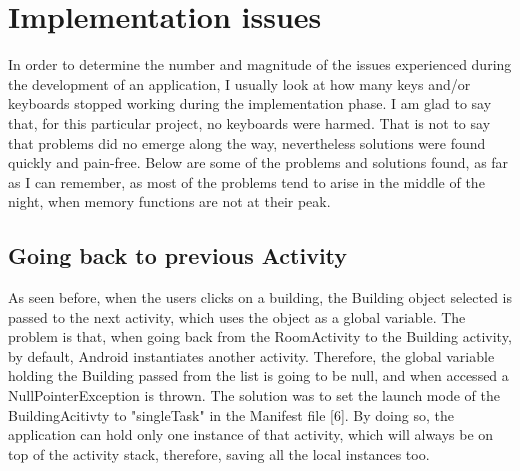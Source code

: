 \section{Implementation issues}
In order to determine the number and magnitude of the issues experienced during the development of an application, I usually look at how many keys and/or keyboards stopped working during the implementation phase. I am glad to say that, for this particular project, no keyboards were harmed. That is not to say that problems did no emerge along the way, nevertheless solutions were found quickly and pain-free. Below are some of the problems and solutions found, as far as I can remember, as most of the problems tend to arise in the middle of the night, when memory functions are not at their peak.

\subsection{Going back to previous Activity}
As seen before, when the users clicks on a building, the Building object selected is passed to the next activity, which uses the object as a global variable. The problem is that, when going back from the RoomActivity to the Building activity, by default, Android instantiates another activity. Therefore, the global variable holding the Building passed from the list is going to be null, and when accessed a NullPointerException is thrown. The solution was to set the launch mode of the BuildingAcitivty to "singleTask" in the Manifest file [6]. By doing so, the application can hold only one instance of that activity, which will always be on top of the activity stack, therefore, saving all the local instances too.


